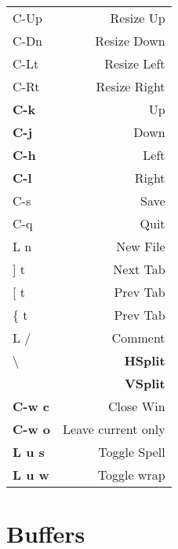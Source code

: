\documentclass[
  ,landscape
  ,columns=4
]{cheatsheet}
\begin{document}
\begin{tabular}{l>{\color{black}}r}
	C-Up           & Resize Up          \\
	C-Dn           & Resize Down        \\
	C-Lt           & Resize Left        \\
	C-Rt           & Resize Right       \\
	\textbf{C-k}   & Up                 \\
	\textbf{C-j}   & Down               \\
	\textbf{C-h}   & Left               \\
	\textbf{C-l}   & Right              \\
	C-s            & Save               \\
	C-q            & Quit               \\
	L n            & New File           \\
	{]} t          & Next Tab           \\
	{[} t          & Prev Tab           \\
	\{ t           & Prev Tab           \\
	L /            & Comment            \\
	\textbackslash & \textbf{HSplit}    \\
	\textbar       & \textbf{VSplit}    \\
	\textbf{C-w c} & Close Win          \\
	\textbf{C-w o} & Leave current only \\
	\textbf{L u s} & Toggle Spell       \\
	\textbf{L u w} & Toggle wrap        \\
\end{tabular}

\section{Buffers}
\end{document}
